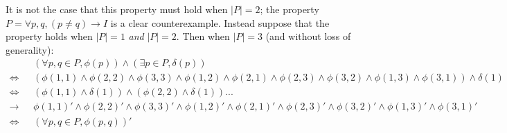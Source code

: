 \documentclass[12pt]{article}
\begin{document}
It is not the case that this property must hold when $|P|=2$; the property $P = \forall p,q, (p \neq q) \rightarrow I$ is a clear counterexample.  Instead suppose that the property holds when $|P|=1$ \textit{and} $|P|=2$.  Then when $|P|=3$ (and without loss of generality):
\begin{align*}
  &(\forall p,q \in P, \phi(p)) \land (\exists p \in P, \delta(p))\\
  \iff &(\phi(1,1) \land \phi(2,2) \land \phi(3,3) \land \phi(1,2) \land \phi(2,1) \land \phi(2,3) \land \phi(3,2) \land \phi(1,3) \land \phi(3,1)) \land \delta(1)\\
  \iff &(\phi(1,1) \land \delta(1)) \land (\phi(2,2) \land \delta(1)) ...\\
  \rightarrow\text{ } &\phi(1,1)' \land \phi(2,2)' \land \phi(3,3)' \land \phi(1,2)' \land \phi(2,1)' \land \phi(2,3)' \land \phi(3,2)' \land \phi(1,3)' \land \phi(3,1)'\\
  \iff &(\forall p,q \in P, \phi(p,q))'
\end{align*}
\end{document}
